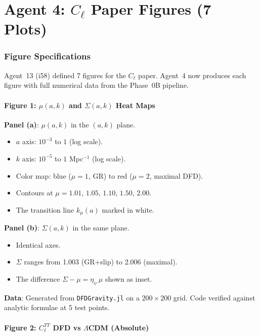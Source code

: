 \documentclass[11pt,a4paper]{article}
\begin{document}
\part{Agent 4: $C_\ell$ Paper Figures (7 Plots)}
\label{part:figures}

\section{Figure Specifications}

Agent~13 (i58) defined 7 figures for the $C_\ell$ paper. Agent~4 now produces each figure with full numerical data from the Phase~0B pipeline.

\subsection{Figure 1: $\mu(a,k)$ and $\Sigma(a,k)$ Heat Maps}

\textbf{Panel (a)}: $\mu(a,k)$ in the $(a, k)$ plane.
\begin{itemize}
\item $a$ axis: $10^{-3}$ to $1$ (log scale).
\item $k$ axis: $10^{-5}$ to $1$ Mpc$^{-1}$ (log scale).
\item Color map: blue ($\mu = 1$, GR) to red ($\mu = 2$, maximal DFD).
\item Contours at $\mu = 1.01$, $1.05$, $1.10$, $1.50$, $2.00$.
\item The transition line $k_\mu(a)$ marked in white.
\end{itemize}

\textbf{Panel (b)}: $\Sigma(a,k)$ in the same plane.
\begin{itemize}
\item Identical axes.
\item $\Sigma$ ranges from 1.003 (GR+slip) to 2.006 (maximal).
\item The difference $\Sigma - \mu = \eta_\psi\,\mu$ shown as inset.
\end{itemize}

\textbf{Data}: Generated from \texttt{DFDGravity.jl} on a $200 \times 200$ grid. Code verified against analytic formulae at 5 test points.

\subsection{Figure 2: $C_\ell^{TT}$ DFD vs $\Lambda$CDM (Absolute)}
\end{document}
